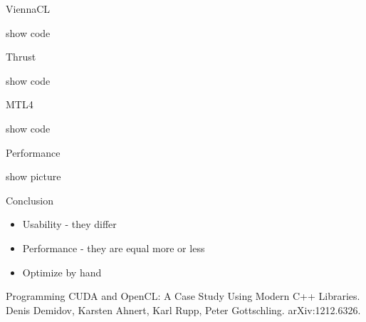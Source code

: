 \documentclass{beamer}
\newcommand{\rem}[1]{}
\newcommand{\heading}[1]{\centerline{\Large #1} \vspace{0.5em}}
\begin{document}
\begin{frame}[fragile]
 \heading{ViennaCL}

show code

\end{frame}




\begin{frame}[fragile]
 \heading{Thrust}

 show code
\end{frame}


\begin{frame}[fragile]
 \heading{MTL4}

 show code

\end{frame}


\begin{frame}[fragile]
 \heading{Performance}

 show picture
\end{frame}

\begin{frame}[fragile]
 \heading{Conclusion}

 \begin{itemize}
  \item Usability - they differ
  \item Performance - they are equal more or less
  \item Optimize by hand
 \end{itemize}

 Programming CUDA and OpenCL: A Case Study Using Modern C++ Libraries. Denis Demidov, Karsten Ahnert, Karl Rupp, Peter Gottschling. arXiv:1212.6326.

\end{frame}





\rem{




%



%
}
\end{document}
